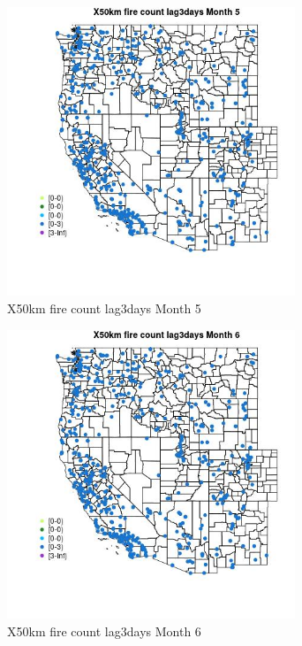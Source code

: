 \begin{figure} 
\centering  
\includegraphics[width=0.77\textwidth]{Code_Outputs/Report_ML_input_PM25_Step4_part_e_de_duplicated_aves_compiled_2019-05-14wNAs_MapObsMo5X50km_fire_count_lag3days.jpg} 
\caption{\label{fig:Report_ML_input_PM25_Step4_part_e_de_duplicated_aves_compiled_2019-05-14wNAsMapObsMo5X50km_fire_count_lag3days}X50km fire count lag3days Month 5} 
\end{figure} 
 

\begin{figure} 
\centering  
\includegraphics[width=0.77\textwidth]{Code_Outputs/Report_ML_input_PM25_Step4_part_e_de_duplicated_aves_compiled_2019-05-14wNAs_MapObsMo6X50km_fire_count_lag3days.jpg} 
\caption{\label{fig:Report_ML_input_PM25_Step4_part_e_de_duplicated_aves_compiled_2019-05-14wNAsMapObsMo6X50km_fire_count_lag3days}X50km fire count lag3days Month 6} 
\end{figure} 
 

